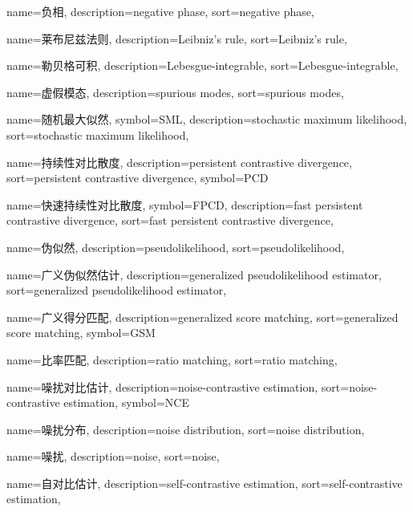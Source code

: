 {
  name=负相,
  description={negative phase},
  sort={negative phase},
}

{
  name=莱布尼兹法则,
  description={Leibniz's rule},
  sort={Leibniz's rule},
}

{
  name=勒贝格可积,
  description={Lebesgue-integrable},
  sort={Lebesgue-integrable},
}

{
  name=虚假模态,
  description={spurious modes},
  sort={spurious modes},
}

{
  name=随机最大似然,
  symbol={SML},
  description={stochastic maximum likelihood},
  sort={stochastic maximum likelihood},
}

{
  name=持续性对比散度,
  description={persistent contrastive divergence},
  sort={persistent contrastive divergence},
  symbol={PCD}
}

{
  name=快速持续性对比散度,
  symbol={FPCD},
  description={fast persistent contrastive divergence},
  sort={fast persistent contrastive divergence},
}

{
  name=伪似然,
  description={pseudolikelihood},
  sort={pseudolikelihood},
}

{
  name=广义伪似然估计,
  description={generalized pseudolikelihood estimator},
  sort={generalized pseudolikelihood estimator},
}

{
  name=广义得分匹配,
  description={generalized score matching},
  sort={generalized score matching},
  symbol={GSM}
}

{
  name=比率匹配,
  description={ratio matching},
  sort={ratio matching},
}

{
  name=噪扰对比估计,
  description={noise-contrastive estimation},
  sort={noise-contrastive estimation},
  symbol={NCE}
}

{
  name=噪扰分布,
  description={noise distribution},
  sort={noise distribution},
}

{
  name=噪扰,
  description={noise},
  sort={noise},
}

{
  name=自对比估计,
  description={self-contrastive estimation},
  sort={self-contrastive estimation},
}

